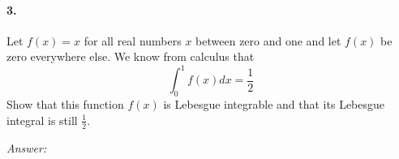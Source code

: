 \documentclass[10pt,a4paper]{article}
\begin{document}
\paragraph{3.} Let $f(x) =x$ for all real numbers $x$ between zero and one and let $f(x)$ be zero everywhere else. We know from calculus that
$$ \int_0^1 f(x)dx = \frac{1}{2}$$
Show that this function $f(x)$ is Lebesgue integrable and that its Lebesgue integral is still $\frac{1}{2}$.
\begin{flushleft}
\textit{Answer:}\\

\end{flushleft}
\end{document}

